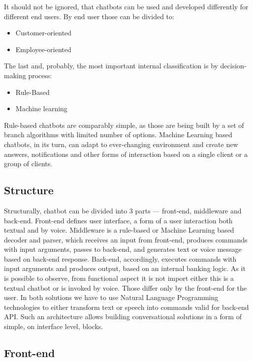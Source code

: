 It should not be ignored, that chatbots can be used and developed differently for different end users.
By end user those can be divided to:
\begin{itemize}
    \item Customer-oriented
    \item Employee-oriented
\end{itemize}

The last and, probably, the most important internal classification is by decision-making process:
\begin{itemize}
    \item Rule-Based
    \item Machine learning
\end{itemize}

Rule-based chatbots are comparably simple, as those are being built by a set of branch algorithms with limited number of options.
Machine Learning based chatbots, in its turn, can adapt to ever-changing environment and create new answers, notifications and other forms of interaction based on a single client or a group of clients.


\subsection{Structure}

Structurally, chatbot can be divided into 3 parts — front-end, middleware and back-end.
Front-end defines user interface, a form of a user interaction both textual and by voice.
Middleware is a rule-based or Machine Learning based decoder and parser, which receives an input from front-end, produces commands with input arguments, passes to back-end, and generates text or voice message based on back-end response.
Back-end, accordingly, executes commands with input arguments and produces output, based on an internal banking logic.
As it is possible to observe, from functional aspect it is not import either this is a textual chatbot or is invoked by voice.
Those differ only by the front-end for the user.
In both solutions we have to use Natural Language Programming technologies to either transform text or speech into commands valid for back-end API.
Such an architecture allows building conversational solutions in a form of simple, on interface level, blocks.

\subsection{Front-end}

